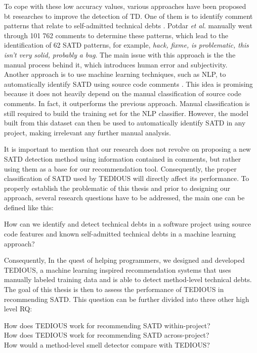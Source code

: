 To cope with these low accuracy values, various approaches have been proposed bt researches to improve the detection of \ac{TD}. One of them is to identify comment patterns that relate to self-admitted technical debts \citep{PotdarS14}. Potdar \emph{et al.} manually went through 101 762 comments to determine these patterns, which lead to the identification of 62 \ac{SATD} patterns, for example, \emph{hack, fixme, is problematic, this isn't very solid, probably a bug}. The main issue with this approach is the the manual process behind it, which introduces human error and subjectivity. Another approach is to use machine learning techniques, such as \ac{NLP}, to automatically identify \ac{SATD} using source code comments \citep{MaldonadoNLP}. This idea is promising because it does not heavily depend on the manual classification of source code comments. In fact, it outperforms the previous approach. Manual classification is still required to build the training set for the NLP classifier. However, the model built from this dataset can then be used to automatically identify \ac{SATD} in any project, making irrelevant any further manual analysis. \par

It is important to mention that our research does not revolve on proposing a new \ac{SATD} detection method using information contained in comments, but rather using them as a base for our recommendation tool. Consequently, the proper classification of \ac{SATD} used by \ac{TEDIOUS} will directly affect its performance. To properly establish the problematic of this thesis and prior to designing our approach, several research questions have to be addressed, the main one can be defined like this:  \par

\begin{framed}
	\noindent How can we identify and detect technical debts in a software project using source code features and known self-admitted technical debts in a machine learning approach?
\end{framed}

Consequently, In the quest of helping programmers, we designed and developed TEDIOUS, a machine learning inspired recommendation systems that uses manually labeled training data and is able to detect method-level technical debts. The goal of this thesis is then to assess the performance of TEDIOUS in recommending SATD. This question can be further divided into three other high level RQ:

\begin{framed}
	 \noindent How does \ac{TEDIOUS} work for recommending \ac{SATD} within-project? \\
	 How does \ac{TEDIOUS} work for recommending SATD across-project? \\
	 How would a method-level smell detector compare with \ac{TEDIOUS}?
\end{framed}
	
